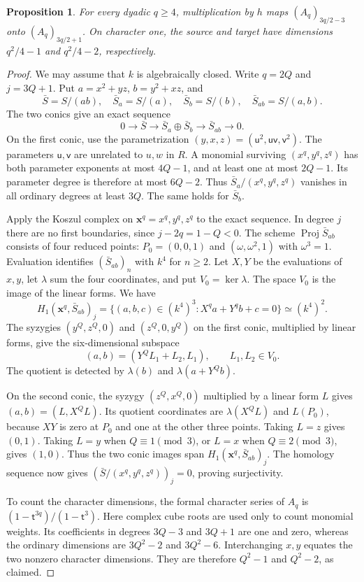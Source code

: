 \documentclass[11pt,a4paper,reqno]{amsart}
\numberwithin{equation}{section}
\theoremstyle{plain}
\newtheorem{proposition}[theorem]{Proposition}
\theoremstyle{definition}
\theoremstyle{remark}
\DeclareMathOperator{\Proj}{Proj}
\begin{document}
\begin{proposition}\label{prop:rank}
For every dyadic $q\geq4$, multiplication by $h$ maps
$(A_q)_{3q/2-3}$ onto $(A_q)_{3q/2+1}$.
On character one, the source and target have dimensions
$q^2/4-1$ and $q^2/4-2$, respectively.
\end{proposition}
\begin{proof}
We may assume that $k$ is algebraically closed. Write $q=2Q$ and
$j=3Q+1$. Put $a=x^2+yz$, $b=y^2+xz$, and
\[
\bar S=S/(ab),\quad \bar S_a=S/(a),\quad \bar S_b=S/(b),\quad \bar S_{ab}=S/(a,b).
\]
The two conics give an exact sequence
\[
0\longrightarrow\bar S\longrightarrow\bar S_a\oplus\bar S_b
\longrightarrow\bar S_{ab}\longrightarrow0.
\]
On the first conic, use the parametrization
$(y,x,z)=(\mathsf u^2,\mathsf u\mathsf v,\mathsf v^2)$.
The parameters $\mathsf u,\mathsf v$ are unrelated to $u,w$ in $R$.
A monomial surviving $(x^q,y^q,z^q)$ has both parameter exponents at
most $4Q-1$, and at least one at most $2Q-1$.
Its parameter degree is therefore at most $6Q-2$.
Thus $\bar S_a/(x^q,y^q,z^q)$ vanishes in all ordinary degrees at least
$3Q$. The same holds for $\bar S_b$.

Apply the Koszul complex on $\mathbf x^q=x^q,y^q,z^q$ to the exact
sequence. In degree $j$ there are no first boundaries, since
$j-2q=1-Q<0$. The scheme $\Proj\bar S_{ab}$ consists of four reduced
points: $P_0=(0,0,1)$ and $(\omega,\omega^2,1)$ with $\omega^3=1$.
Evaluation identifies $(\bar S_{ab})_n$ with $k^4$ for $n\geq2$.
Let $X,Y$ be the evaluations of $x,y$, let $\lambda$ sum the four
coordinates, and put $V_0=\ker\lambda$. The space $V_0$ is the
image of the linear forms. We have
\[
H_1(\mathbf x^q,\bar S_{ab})_j
=\{(a,b,c)\in(k^4)^3:X^qa+Y^qb+c=0\}\simeq(k^4)^2.
\]
The syzygies $(y^Q,z^Q,0)$ and $(z^Q,0,y^Q)$ on the first conic,
multiplied by linear forms, give the six-dimensional subspace
\[
(a,b)=(Y^QL_1+L_2,L_1),\qquad L_1,L_2\in V_0.
\]
The quotient is detected by $\lambda(b)$ and $\lambda(a+Y^Qb)$.

On the second conic, the syzygy $(z^Q,x^Q,0)$ multiplied by a linear
form $L$ gives $(a,b)=(L,X^QL)$.
Its quotient coordinates are $\lambda(X^QL)$ and $L(P_0)$, because
$XY$ is zero at $P_0$ and one at the other three points.
Taking $L=z$ gives $(0,1)$.
Taking $L=y$ when $Q\equiv1\pmod3$, or $L=x$ when
$Q\equiv2\pmod3$, gives $(1,0)$.
Thus the two conic images span $H_1(\mathbf x^q,\bar S_{ab})_j$.
The homology sequence now gives
$(\bar S/(x^q,y^q,z^q))_j=0$, proving surjectivity.

To count the character dimensions, the formal character series of
$A_q$ is $(1-\mathsf t^{3q})/(1-\mathsf t^3)$.
Here complex cube roots are used only to count monomial weights.
Its coefficients in degrees $3Q-3$ and $3Q+1$ are one and zero,
whereas the ordinary dimensions are $3Q^2-2$ and $3Q^2-6$.
Interchanging $x,y$ equates the two nonzero character dimensions.
They are therefore $Q^2-1$ and $Q^2-2$, as claimed.
\end{proof}
\end{document}
